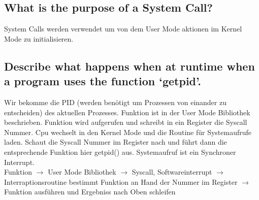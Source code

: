 %
%
%

\subsection{What is the purpose of a System Call?}
System Calls werden verwendet um von dem User Mode aktionen im Kernel Mode zu initialisieren.

\subsection{Describe what happens when at runtime when a program uses the function `getpid'.}
Wir bekomme die PID (werden ben\"otigt um Prozessen von einander zu entscheiden) des aktuellen Prozesses. Funktion ist in der User Mode Bibliothek beschrieben. Funktion wird aufgerufen und schreibt in ein Register die Syscall Nummer. Cpu wechselt in den Kernel Mode und die Routine f\"ur Systemaufrufe laden. Schaut die Syscall Nummer im Register nach und f\"uhrt dann die entsprechende Funktion hier getpid() aus. Systemaufruf ist ein Synchroner Interrupt.\\
Funktion $\rightarrow$ User Mode Bibliothek $\rightarrow$ Syscall, Softwareinterrupt $\rightarrow$ Interraptionsroutine bestimmt Funktion an Hand der Nummer im Register $\rightarrow$ Funktion ausf\"uhren und Ergebniss nach Oben schleifen

